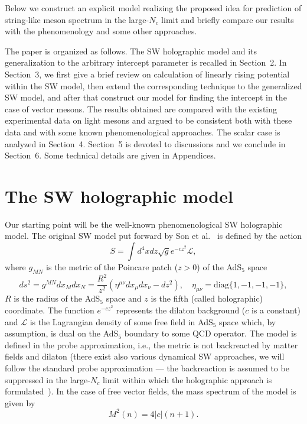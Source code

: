 \documentclass[a4paper,11pt]{article}
\newcommand{\lb}[0]{\left(}
\newcommand{\rb}[0]{\right)}
\begin{document}
Below we construct an explicit model realizing the proposed idea for prediction of
string-like meson spectrum in the large-$N_c$ limit and briefly compare our results with
the phenomenology and some other approaches.

The paper is organized as follows. The SW holographic model and its
generalization to the arbitrary intercept parameter is recalled in Section~2. In Section~3, we first give a brief review
on calculation of linearly rising potential within the SW model, then extend the corresponding technique to
the generalized SW model, and after that construct our model for finding the intercept in the case of vector mesons.
The results obtained are compared with the existing experimental data on light mesons and argued to be consistent both
with these data and with some known phenomenological approaches.
The scalar case is analyzed in Section~4. Section~5 is devoted to discussions and we conclude in Section~6.
Some technical details are given in Appendices.





\section{The SW holographic model}

Our starting point will be the well-known phenomenological SW holographic model.
The original SW model put forward by Son et al.~\cite{son2} is defined by the action
\begin{equation}
\label{SW}
  S=\int d^4xdz\sqrt{g}e^{-cz^2}\mathcal{L},
\end{equation}
where \(g_{MN}\) is the metric of the Poincare patch (\(z>0\)) of the AdS\(_5\) space
\begin{equation}
  ds^2=g^{MN}dx_Mdx_N=\frac{R^2}{z^2}\lb\eta^{\mu\nu}dx_\mu dx_\nu-dz^2\rb,\quad
  \eta_{\mu\nu}=\text{diag}\lbrace1,-1,-1,-1\rbrace,
\end{equation}
\(R\) is the radius of the AdS\(_5\) space and \(z\) is the fifth (called holographic) coordinate.
The function $e^{-cz^2}$ represents the dilaton background ($c$ is a constant) and
$\mathcal{L}$ is the Lagrangian density of some free field in AdS\(_5\) space which, by assumption, is
dual on the AdS\(_5\) boundary to some QCD operator. The model is defined in the probe
approximation, i.e., the metric is not backreacted by matter fields and dilaton (there exist also various dynamical
SW approaches, we will follow the standard probe approximation --- the backreaction
is assumed to be suppressed in the large-$N_c$ limit within which the holographic approach is formulated~\cite{Afonin:2021cwo}).
In the case of free vector fields, the mass spectrum of the model is given by~\cite{son2}
\begin{equation}
\label{spSW}
  M^2(n)=4|c|(n+1).
\end{equation}
\end{document}
